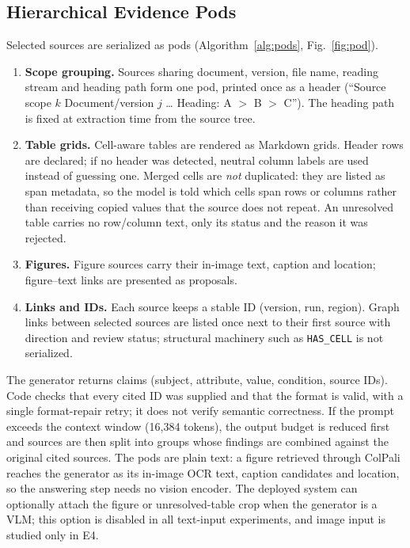 \documentclass[conference]{IEEEtran}
\begin{document}
\subsection{Hierarchical Evidence Pods}
Selected sources are serialized as pods (Algorithm~\ref{alg:pods}, Fig.~\ref{fig:pod}).
\begin{enumerate}
\item \textbf{Scope grouping.} Sources sharing document, version, file name, reading stream and heading path form one pod, printed once as a header (``Source scope $k$ \textbar{} Document/version $j$ \ldots{} Heading: A $>$ B $>$ C''). The heading path is fixed at extraction time from the source tree.
\item \textbf{Table grids.} Cell-aware tables are rendered as Markdown grids. Header rows are declared; if no header was detected, neutral column labels are used instead of guessing one. Merged cells are \emph{not} duplicated: they are listed as span metadata, so the model is told which cells span rows or columns rather than receiving copied values that the source does not repeat. An unresolved table carries no row/column text, only its status and the reason it was rejected.
\item \textbf{Figures.} Figure sources carry their in-image text, caption and location; figure--text links are presented as proposals.
\item \textbf{Links and IDs.} Each source keeps a stable ID (version, run, region). Graph links between selected sources are listed once next to their first source with direction and review status; structural machinery such as \texttt{HAS\_CELL} is not serialized.
\end{enumerate}
The generator returns claims (subject, attribute, value, condition, source IDs). Code checks that every cited ID was supplied and that the format is valid, with a single format-repair retry; it does not verify semantic correctness. If the prompt exceeds the context window (16{,}384 tokens), the output budget is reduced first and sources are then split into groups whose findings are combined against the original cited sources. The pods are plain text: a figure retrieved through ColPali reaches the generator as its in-image OCR text, caption candidates and location, so the answering step needs no vision encoder. The deployed system can optionally attach the figure or unresolved-table crop when the generator is a VLM; this option is disabled in all text-input experiments, and image input is studied only in E4.
\end{document}
